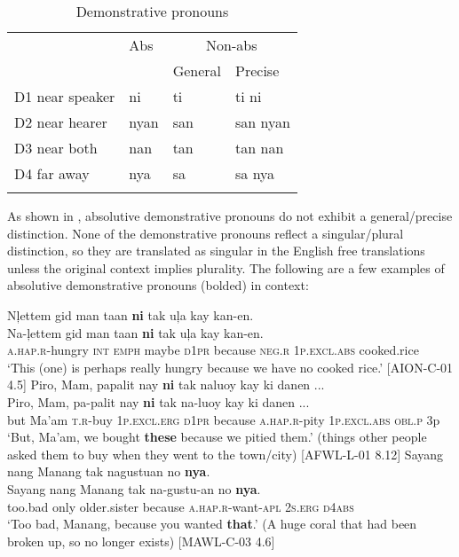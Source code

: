 \begin{table}
\caption{Demonstrative pronouns}
\label{tab:demonstrativepronouns}
\begin{tabularx}{\textwidth}{Xl@{\qquad\qquad}l@{\qquad\qquad}l}
\lsptoprule
& Abs & \multicolumn{2}{c}{Non-abs} \\
\cmidrule{3-4}
&  & General & Precise \\
\midrule
D1 near speaker & ni & ti & ti ni \\
D2 near hearer & nyan & san & san nyan \\
D3 near both & nan & tan & tan nan \\
D4 far away & nya & sa & sa nya \\
\lspbottomrule
\end{tabularx}
\end{table}
As shown in , absolutive demonstrative pronouns do not exhibit a  general/precise distinction. None of the demonstrative pronouns reflect a singular/plural distinction, so they are translated as singular in the English free translations unless the original context implies plurality. The following are a few examples of absolutive demonstrative pronouns (bolded) in context:

\newpage
\ea
Nļettem  gid  man  taan  \textbf{ni}   tak  uļa  kay kan-en. \\\smallskip
 \gll Na-ļettem  gid  man  taan  \textbf{ni}   tak  uļa  kay kan-en. \\
\textsc{a.hap.r}-hungry  \textsc{int}  \textsc{emph}  maybe  \textsc{d1pr}  because  \textsc{neg.r} 1\textsc{p.excl.abs} cooked.rice \\
\glt ‘This (one) is perhaps really hungry because we have no cooked rice.’ [AION-C-01 4.5]
\z
\ea
Piro,  Mam,  papalit  nay  \textbf{ni}  tak  naluoy kay  ki  danen ... \\\smallskip
 \gll Piro,  Mam,  pa-palit  nay  \textbf{ni}  tak  na-luoy kay  ki  danen ... \\
but  Ma’am  \textsc{t.}\textsc{r}-buy  1\textsc{p.excl.erg}  \textsc{d1pr}  because  \textsc{a.hap.r}-pity 1\textsc{p.excl.abs}  \textsc{obl.p}  3p \\
\glt `But, Ma’am, we bought \textbf{these} because we pitied them.’ (things other people asked them to buy when they went to the town/city) [AFWL-L-01 8.12]
\z
\ea
Sayang  nang  Manang  tak  nagustuan  no  \textbf{nya}. \\\smallskip
 \gll Sayang  nang  Manang  tak  na-gustu-an  no  \textbf{nya}. \\
too.bad  only  older.sister  because  \textsc{a.hap.r}-want\textsc{-apl}  2\textsc{s.erg}  \textsc{d4abs} \\
\glt ‘Too bad, Manang, because you wanted \textbf{that}.’ (A huge coral that had been broken up, so no longer exists) [MAWL-C-03 4.6]
\z

